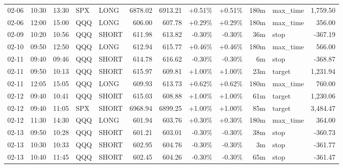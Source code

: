 \documentclass[11pt,a4paper,twoside]{article}
\begin{document}
\begin{center}
\begin{longtable}{>{\color{txtmain}}l l l l l r r r r r >{\color{txtmain}}l r}
02-06 & 10:30 & 13:30 & SPX & LONG & 6878.02 & 6913.21 & \textcolor{wingreen}{+0.51\%} & \textcolor{wingreen}{+0.51\%} & 180m & max\_time & \textcolor{wingreen}{1,759.50} \\
02-06 & 12:00 & 15:00 & QQQ & LONG & 606.00 & 607.78 & \textcolor{wingreen}{+0.29\%} & \textcolor{wingreen}{+0.29\%} & 180m & max\_time & \textcolor{wingreen}{356.00} \\
02-09 & 10:20 & 10:56 & QQQ & SHORT & 611.98 & 613.82 & \textcolor{lossred}{-0.30\%} & \textcolor{lossred}{-0.30\%} & 36m & stop & \textcolor{lossred}{-367.19} \\
02-10 & 09:50 & 12:50 & QQQ & LONG & 612.94 & 615.77 & \textcolor{wingreen}{+0.46\%} & \textcolor{wingreen}{+0.46\%} & 180m & max\_time & \textcolor{wingreen}{566.00} \\
02-11 & 09:40 & 09:46 & QQQ & SHORT & 614.78 & 616.62 & \textcolor{lossred}{-0.30\%} & \textcolor{lossred}{-0.30\%} & 6m & stop & \textcolor{lossred}{-368.87} \\
02-11 & 09:50 & 10:13 & QQQ & SHORT & 615.97 & 609.81 & \textcolor{wingreen}{+1.00\%} & \textcolor{wingreen}{+1.00\%} & 23m & target & \textcolor{wingreen}{1,231.94} \\
02-11 & 12:05 & 15:05 & QQQ & LONG & 609.93 & 613.73 & \textcolor{wingreen}{+0.62\%} & \textcolor{wingreen}{+0.62\%} & 180m & max\_time & \textcolor{wingreen}{760.00} \\
02-12 & 09:40 & 10:41 & QQQ & SHORT & 615.03 & 608.88 & \textcolor{wingreen}{+1.00\%} & \textcolor{wingreen}{+1.00\%} & 61m & target & \textcolor{wingreen}{1,230.06} \\
02-12 & 09:40 & 11:05 & SPX & SHORT & 6968.94 & 6899.25 & \textcolor{wingreen}{+1.00\%} & \textcolor{wingreen}{+1.00\%} & 85m & target & \textcolor{wingreen}{3,484.47} \\
02-12 & 11:30 & 14:30 & QQQ & LONG & 601.94 & 603.76 & \textcolor{wingreen}{+0.30\%} & \textcolor{wingreen}{+0.30\%} & 180m & max\_time & \textcolor{wingreen}{364.00} \\
02-13 & 09:50 & 10:28 & QQQ & SHORT & 601.21 & 603.01 & \textcolor{lossred}{-0.30\%} & \textcolor{lossred}{-0.30\%} & 38m & stop & \textcolor{lossred}{-360.73} \\
02-13 & 10:30 & 10:33 & QQQ & SHORT & 602.95 & 604.76 & \textcolor{lossred}{-0.30\%} & \textcolor{lossred}{-0.30\%} & 3m & stop & \textcolor{lossred}{-361.77} \\
02-13 & 10:40 & 11:45 & QQQ & SHORT & 602.45 & 604.26 & \textcolor{lossred}{-0.30\%} & \textcolor{lossred}{-0.30\%} & 65m & stop & \textcolor{lossred}{-361.47} \\

\end{longtable}
\end{center}
\end{document}
